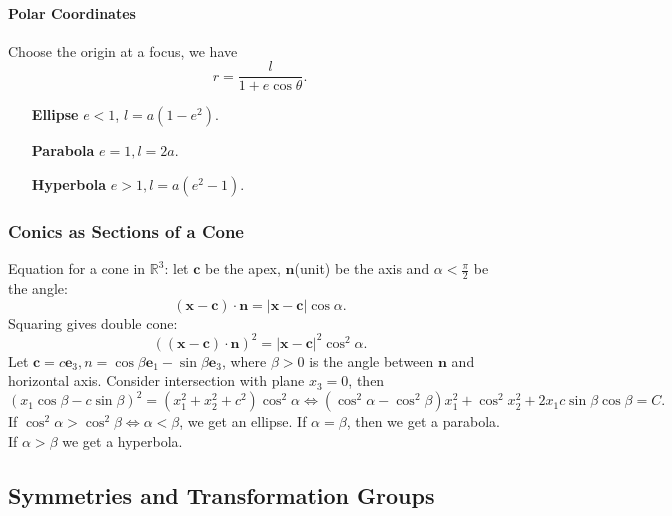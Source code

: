 \documentclass[a4paper]{article}
\begin{document}
    \paragraph{Polar Coordinates}
    Choose the origin at a focus, we have
    \[
      r = \frac{l}{1+e\cos \theta}.
    \]
    \begin{enumerate}[align=left]
      \item[\bfseries Ellipse] $e<1$, $ l=a(1-e^2) $.
      \item[\bfseries Parabola] $ e=1, l=2a $.
      \item[\bfseries Hyperbola] $ e>1, l=a(e^2-1) $.
    \end{enumerate}
    \subsubsection{Conics as Sections of a Cone}
    Equation for a cone in $ \mathbb{R}^{3} $:
    let $\mathbf{c}$ be the apex, $\mathbf{n}$(unit) be the axis and
    $ \alpha<\frac{\pi}{2} $ be the angle:
    \[
      (\mathbf{x}-\mathbf{c})\cdot
      \mathbf{n}=|\mathbf{x}-\mathbf{c}|\cos \alpha.
    \]
    Squaring gives double cone:
    \[
      ((\mathbf{x}-\mathbf{c})\cdot
      \mathbf{n})^2=|\mathbf{x}-\mathbf{c}|^2\cos^2 \alpha.
    \]
    Let $ \mathbf{c}=c\mathbf{e}_3,n=\cos \beta \mathbf{e}_1-\sin
    \beta \mathbf{e}_3 $, where $ \beta>0 $ is the angle between
    $\mathbf{n}$ and horizontal axis. Consider intersection with
    plane $x_3=0$, then
    \[
      (x_1 \cos \beta-c \sin \beta)^2=(x_1^2+x_2^2+c^2)\cos^2 \alpha
      \Longleftrightarrow (\cos^2
      \alpha-\cos^2\beta)x_1^2+\cos^2x_2^2+2x_1c \sin \beta \cos \beta = C.
    \]
    If $ \cos^2 \alpha>\cos^2 \beta \Leftrightarrow \alpha<\beta $,
    we get an ellipse. If $ \alpha=\beta $, then we get a parabola.
    If $ \alpha>\beta $ we get a hyperbola.
    \subsection{Symmetries and Transformation Groups}
\end{document}
